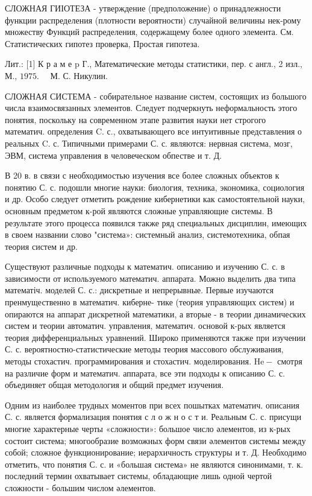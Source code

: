 \documentclass[10pt]{article}
\begin{document}
СЛОЖНАЯ ГИІОТЕЗА - утверждение (предположение) о принадлежности функции распределения (плотности вероятности) случайной величины нек-рому множеству Функций распределения, содержащему более одного элемента. См. Статистических гипотез проверка, Простая гипотеза.



Лит.: [1] К р а м е p Г., Математические методы статистики, пер. с англ., 2 изл., М., $1975 . \quad$ М. С. Никулин.



СЛОЖНАЯ СИСТЕМА - собирательное название систем, состоящих из большого числа взаимосвязанных элементов. Следует подчеркнуть неформальность этого понятия, поскольку на современном этапе развития науки нет строгого математич. определения C. с., охватывающего все интуитивные представления о реальных C. с. Типичными примерами С. с. являются: нервная система, мозг, ЭВМ, система управления в человеческом обпестве и т. Д.



В 20 в. в связи с необходимостью изучения все более сложных объектов к понятию С. с. подошли многие науки: биология, техника, экономика, социология и др. Особо следует отметить рождение кибернетики как самостоятельной науки, основным предметом к-рой являются сложные управляющие системы. В результате этого процесса появился также ряд специальных дисциплин, имеющих в своем названии слово "система»: системный анализ, системотехника, обпая теория систем и др.



Существуют различные подходы к математич. описанию и изучению С. с. в зависимости от используемого математич. аппарата. Можно выделить два типа математіч. моделей С. с.: дискретные и непрерывные. Первые изучаются пренмущественно в математич. киберне- тике (теория управляющих систем) и опираются на аппарат дискретной математики, а вторые - в теории динамических систем и теории автоматич. управления, математич. основой к-рых является теория дифференциальных уравнений. Широко применяются также при изучении С. с. вероятностно-статистические методы теория массового обслуживания, методы стохастич. программирования и стохастич. моделирования. $\mathrm{He}-$ смотря на различие форм и математич. аппарата, все эти подходы к описанию С. с. объединяет общая методология и общий предмет изучения.



Одним из наиболее трудных моментов при всех пошытках математич. описания С. с. является формализация понятия с л о ж н о с т и. Реальным С. с. присущи многие характерные черты «сложности»: большое число әлементов, из к-рых состоит система; многообразие возможных форм связи әлементов системы между собой; сложное функционирование; иерархичность структуры и т. Д. Необходимо отметить, что понятия С. с. и «большая система» не являются синонимами, т. к. последний термин охватывает системы, обладающие лишь одной чертой сложности - большим числом әлементов.
\end{document}
